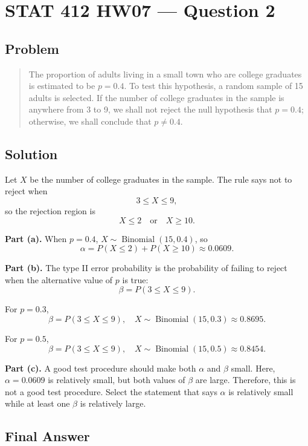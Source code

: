 \documentclass[11pt]{article}
\begin{document}
\section*{STAT 412 HW07 --- Question 2}

\subsection*{Problem}

\begin{quote}
The proportion of adults living in a small town who are college graduates is estimated to be $p=0.4$. To test this hypothesis, a random sample of 15 adults is selected. If the number of college graduates in the sample is anywhere from 3 to 9, we shall not reject the null hypothesis that $p=0.4$; otherwise, we shall conclude that $p\ne0.4$.
\end{quote}

\subsection*{Solution}

Let $X$ be the number of college graduates in the sample. The rule says not to reject when
\[
3\le X\le 9,
\]
so the rejection region is
\[
X\le2 \quad\text{or}\quad X\ge10.
\]

\textbf{Part (a).} When $p=0.4$, $X\sim\operatorname{Binomial}(15,0.4)$, so
\[
\alpha=P(X\le2)+P(X\ge10)\approx 0.0609.
\]

\textbf{Part (b).} The type II error probability is the probability of failing to reject when the alternative value of $p$ is true:
\[
\beta=P(3\le X\le9).
\]

For $p=0.3$,
\[
\beta=P(3\le X\le9),\quad X\sim\operatorname{Binomial}(15,0.3)
      \approx 0.8695.
\]

For $p=0.5$,
\[
\beta=P(3\le X\le9),\quad X\sim\operatorname{Binomial}(15,0.5)
      \approx 0.8454.
\]

\textbf{Part (c).} A good test procedure should make both $\alpha$ and $\beta$ small. Here, $\alpha=0.0609$ is relatively small, but both values of $\beta$ are large. Therefore, this is not a good test procedure. Select the statement that says $\alpha$ is relatively small while at least one $\beta$ is relatively large.

\subsection*{Final Answer}

\end{document}
